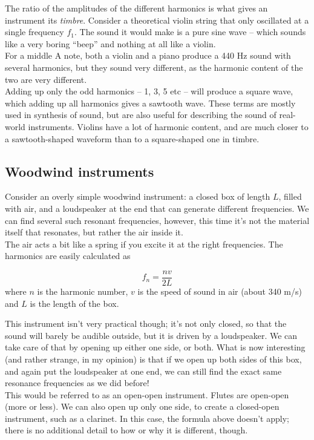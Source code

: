 The ratio of the amplitudes of the different harmonics is what gives an instrument its \emph{timbre}. Consider a theoretical violin string that only oscillated at a single frequency $f_1$. The sound it would make is a pure sine wave -- which sounds like a very boring ``beep'' and nothing at all like a violin.\\
For a middle A note, both a violin and a piano produce a 440 Hz sound with several harmonics, but they sound very different, as the harmonic content of the two are very different.\\
Adding up only the odd harmonics -- 1, 3, 5 etc -- will produce a square wave, which adding up all harmonics gives a sawtooth wave. These terms are mostly used in synthesis of sound, but are also useful for describing the sound of real-world instruments. Violins have a lot of harmonic content, and are much closer to a sawtooth-shaped waveform than to a square-shaped one in timbre.

\subsection{Woodwind instruments}

Consider an overly simple woodwind instrument: a closed box of length $L$, filled with air, and a loudspeaker at the end that can generate different frequencies. We can find several such resonant frequencies, however, this time it's not the material itself that resonates, but rather the air inside it.\\
The air acts a bit like a spring if you excite it at the right frequencies. The harmonics are easily calculated as

\begin{equation}
f_n = \frac{n v}{2 L}
\end{equation}
where $n$ is the harmonic number, $v$ is the speed of sound in air (about 340 m/s) and $L$ is the length of the box.

This instrument isn't very practical though; it's not only closed, so that the sound will barely be audible outside, but it is driven by a loudspeaker. We can take care of that by opening up either one side, or both. What is now interesting (and rather strange, in my opinion) is that if we open up both sides of this box, and again put the loudspeaker at one end, we can still find the exact same resonance frequencies as we did before!\\
This would be referred to as an open-open instrument. Flutes are open-open (more or less).
We can also open up only one side, to create a closed-open instrument, such as a clarinet. In this case, the formula above doesn't apply; there is no additional detail to how or why it is different, though.

